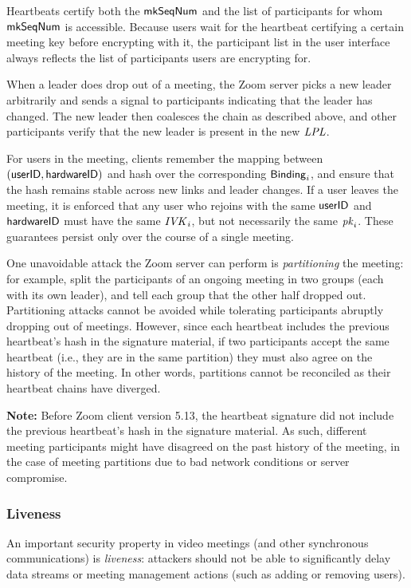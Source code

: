 Heartbeats certify both the $\mathsf{mkSeqNum}$ and the list of participants for whom $\mathsf{mkSeqNum}$ is accessible.
Because users wait for the heartbeat certifying a certain meeting key before encrypting with it, the
participant list in the user interface always reflects the list of participants users are encrypting for.

When a leader does drop out of a meeting, the Zoom server picks a new leader arbitrarily and sends a
signal to participants indicating that the leader has changed. The new leader then coalesces the
chain as described above, and other participants verify that the new leader is present in the new
$\mathit{LPL}$.

For users in the meeting, clients remember the mapping between $(\mathsf{userID}, {\sf hardwareID})$ and hash
over the corresponding ${\sf Binding}_i$, and ensure that the hash remains stable across new links and
leader changes. If a user leaves the meeting, it is enforced that any user who rejoins with the same
$\mathsf{userID}$ and ${\sf hardwareID}$ must have the same $\mathit{IVK}_i$, but not necessarily the same $\mathit{pk}_i$. These
guarantees persist only over the course of a single meeting.

One unavoidable attack the Zoom server can perform is \textit{partitioning} the meeting: for example, split the participants of an ongoing meeting in two groups (each with its own leader), and tell each group that the other half dropped out. Partitioning attacks cannot be avoided while tolerating participants abruptly dropping out of meetings. However, since each heartbeat includes the previous heartbeat's hash in the signature material, if two participants accept the same heartbeat (i.e., they are in the same partition) they must also agree on the history of the meeting. In other words, partitions cannot be reconciled as their heartbeat chains have diverged.

\textbf{Note: } Before Zoom client version 5.13, the heartbeat signature did not include the previous heartbeat's hash in the signature material.
As such, different meeting participants might have disagreed on the past history of the meeting, in the case of meeting partitions
due to bad network conditions or server compromise.

\subsubsection{Liveness}\label{subsubsec:liveness}
An important security property in video meetings (and other synchronous communications) is \textit{liveness}: attackers
should not be able to significantly delay data streams or meeting management actions (such as adding or removing users).

